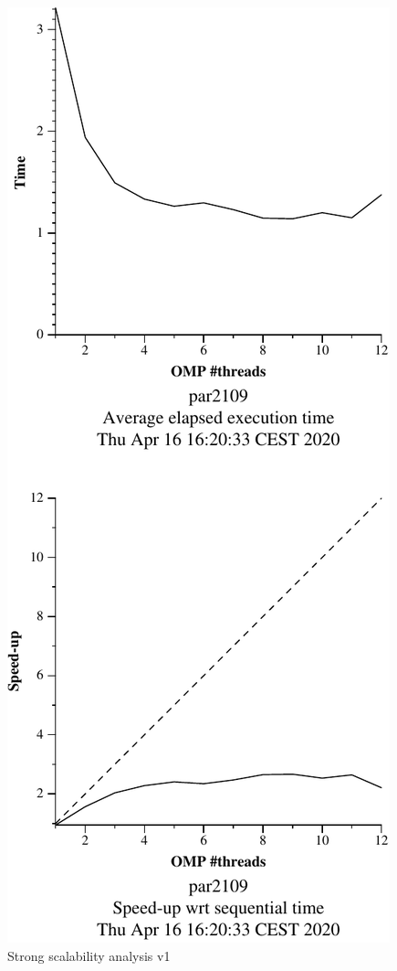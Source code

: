 \begin{figure}[H]
    \begin{minipage}{0.5\textwidth}
        \centering
        \includegraphics[width=0.7\linewidth]{plots/v1-crop.pdf}
        \caption{Strong scalability analysis v1}
        \label{fig:ssa_v1} 
    \end{minipage}
    \begin{minipage}{0.5\textwidth}
        \centering

\end{minipage}
\end{figure}
